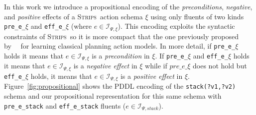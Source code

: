 \documentclass{article}
\newcommand{\strips}{\textsc{Strips}}
\begin{document}
In this work we introduce a propositional encoding of the {\em preconditions}, {\em negative}, and {\em positive} effects of a \strips\ action schema $\xi$ using only fluents of two kinds {\tt\small pre\_e\_$\xi$} and {\tt\small eff\_e\_$\xi$} (where $e\in{\mathcal I}_{\Psi,\xi}$). This encoding exploits the syntactic constraints of \strips\, so it is more compact that the one previously proposed by~\citeauthor{aineto2018learning}~\citeyear{aineto2018learning} for learning classical planning action models. In more detail, if {\tt\small pre\_e\_$\xi$} holds it means that $e\in{\mathcal I}_{\Psi,\xi}$ is a {\em precondition} in $\xi$. If {\tt\small pre\_e\_$\xi$} and {\tt\small eff\_e\_$\xi$} holds it means that $e\in{\mathcal I}_{\Psi,\xi}$ is a {\em negative effect} in $\xi$ while if $pre\_e\_\xi$ does not hold but {\tt\small eff\_e\_$\xi$} holds, it means that $e\in{\mathcal I}_{\Psi,\xi}$ is a {\em positive effect} in $\xi$. Figure~\ref{fig:propositional} shows the PDDL encoding of the {\tt\small stack(?v1,?v2)} schema and our propositional representation for this same schema with {\tt\small pre\_e\_stack} and {\tt\small eff\_e\_stack} fluents ($e\in{\mathcal I}_{\Psi,stack}$).
\end{document}
